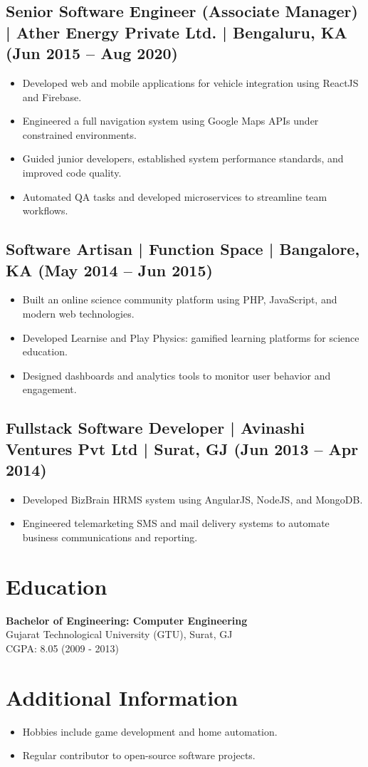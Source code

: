 \documentclass[10pt,a4paper]{article}
\begin{document}
\subsection*{Senior Software Engineer (Associate Manager) | Ather Energy Private Ltd. | Bengaluru, KA (Jun 2015 -- Aug 2020)}
\begin{itemize}[leftmargin=*]
  \item Developed web and mobile applications for vehicle integration using ReactJS and Firebase.
  \item Engineered a full navigation system using Google Maps APIs under constrained environments.
  \item Guided junior developers, established system performance standards, and improved code quality.
  \item Automated QA tasks and developed microservices to streamline team workflows.
\end{itemize}

\subsection*{Software Artisan | Function Space | Bangalore, KA (May 2014 -- Jun 2015)}
\begin{itemize}[leftmargin=*]
  \item Built an online science community platform using PHP, JavaScript, and modern web technologies.
  \item Developed Learnise and Play Physics: gamified learning platforms for science education.
  \item Designed dashboards and analytics tools to monitor user behavior and engagement.
\end{itemize}

\subsection*{Fullstack Software Developer | Avinashi Ventures Pvt Ltd | Surat, GJ (Jun 2013 -- Apr 2014)}
\begin{itemize}[leftmargin=*]
  \item Developed BizBrain HRMS system using AngularJS, NodeJS, and MongoDB.
  \item Engineered telemarketing SMS and mail delivery systems to automate business communications and reporting.
\end{itemize}

\section*{Education}
\textbf{Bachelor of Engineering: Computer Engineering} \\
Gujarat Technological University (GTU), Surat, GJ \\
CGPA: 8.05 (2009 - 2013)

\section*{Additional Information}
\begin{itemize}[leftmargin=*]
  \item Hobbies include game development and home automation.
  \item Regular contributor to open-source software projects.
\end{itemize}
\end{document}
